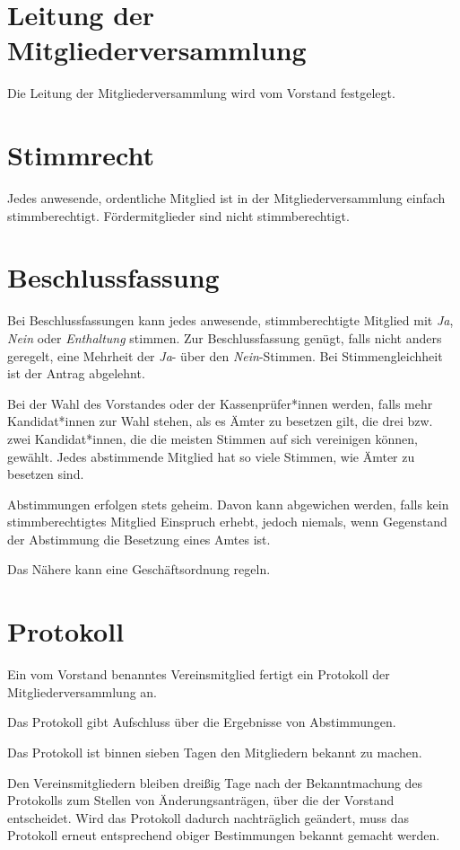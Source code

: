 \section{Leitung der Mitgliederversammlung}
Die Leitung der Mitgliederversammlung wird vom Vorstand festgelegt.

\section{Stimmrecht}
Jedes anwesende, ordentliche Mitglied ist in der Mitgliederversammlung einfach stimmberechtigt. Fördermitglieder sind nicht stimmberechtigt.

\section{Beschlussfassung}
\begin{absätze}
    \item Bei Beschlussfassungen kann jedes anwesende, stimmberechtigte Mitglied mit \textit{Ja}, \textit{Nein} oder \textit{Enthaltung} stimmen. Zur Beschlussfassung genügt, falls nicht anders geregelt, eine Mehrheit der \textit{Ja}- über den \textit{Nein}-Stimmen. Bei Stimmengleichheit ist der Antrag abgelehnt.
    \item Bei der Wahl des Vorstandes oder der Kassenprüfer*innen werden, falls mehr Kandidat*innen zur Wahl stehen, als es Ämter zu besetzen gilt, die drei bzw. zwei Kandidat*innen, die die meisten Stimmen auf sich vereinigen können, gewählt. Jedes abstimmende Mitglied hat so viele Stimmen, wie Ämter zu besetzen sind.
    \item Abstimmungen erfolgen stets geheim. Davon kann abgewichen werden, falls kein stimmberechtigtes Mitglied Einspruch erhebt, jedoch niemals, wenn Gegenstand der Abstimmung die Besetzung eines Amtes ist.
    \item Das Nähere kann eine Geschäftsordnung regeln.
\end{absätze}

\section{Protokoll}
\begin{absätze}
    \item Ein vom Vorstand benanntes Vereinsmitglied fertigt ein Protokoll der Mitgliederversammlung an.
    \item Das Protokoll gibt Aufschluss über die Ergebnisse von Abstimmungen.
    \item Das Protokoll ist binnen sieben Tagen den Mitgliedern bekannt zu machen.
    \item Den Vereinsmitgliedern bleiben dreißig Tage nach der Bekanntmachung des Protokolls zum Stellen von Änderungsanträgen, über die der Vorstand entscheidet. Wird das Protokoll dadurch nachträglich geändert, muss das Protokoll erneut entsprechend obiger Bestimmungen bekannt gemacht werden.
\end{absätze}

